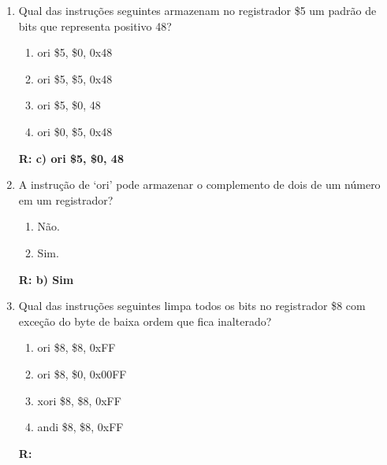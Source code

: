 \documentclass[a4paper,11pt]{article}
\begin{document}
\begin{enumerate}
    \item{Qual das instruções seguintes armazenam no registrador \$5 um padrão de bits que
            representa positivo 48?}
        \begin{enumerate}
            \item{ori \$5, \$0, 0x48}
            \item{ori \$5, \$5, 0x48}
            \item{ori \$5, \$0, 48}
            \item{ori \$0, \$5, 0x48}
        \end{enumerate}
        \textbf{R: c) ori \$5, \$0, 48}

    \item{A instrução de `ori' pode armazenar o complemento de dois de um número em um registrador?}
        \begin{enumerate}
            \item{Não.}
            \item{Sim.}
        \end{enumerate}
        \textbf{R: b) Sim}

    \item{Qual das instruções seguintes limpa todos os bits no registrador \$8 com exceção do byte de
            baixa ordem que fica inalterado?}
        \begin{enumerate}
            \item{ori \$8, \$8, 0xFF}
            \item{ori \$8, \$0, 0x00FF}
            \item{xori \$8, \$8, 0xFF}
            \item{andi \$8, \$8, 0xFF}
        \end{enumerate}
        \textbf{R: }


\end{enumerate}
\end{document}
